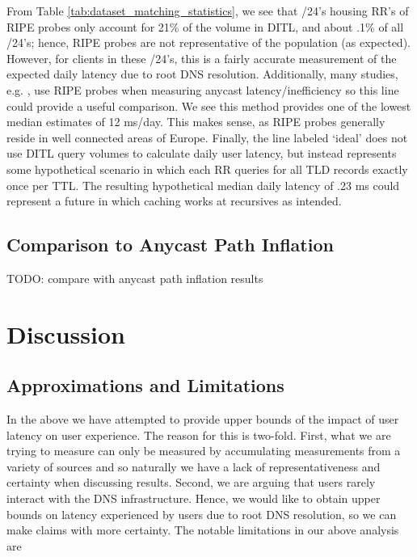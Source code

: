 \documentclass[sigconf,nonacm,10pt]{acmart}
\begin{document}
From Table \ref{tab:dataset_matching_statistics}, we see that /24's
housing RR's of RIPE probes only account for 21\% of the volume in DITL,
and about .1\% of all /24's; hence, RIPE probes are not representative
of the population (as expected). However, for clients in these /24's,
this is a fairly accurate measurement of the expected daily latency due
to root DNS resolution. Additionally, many studies, e.g.
\cite{li_levin_spring_bhattacharjee_2018}, use RIPE probes when
measuring anycast latency/inefficiency so this line could provide a
useful comparison. We see this method provides one of the lowest median
estimates of 12 ms/day. This makes sense, as RIPE probes generally
reside in well connected areas of Europe. \break \break
Finally, the line labeled `ideal' does not use DITL query volumes to
calculate daily user latency, but instead represents some hypothetical
scenario in which each RR queries for all TLD records exactly once per
TTL. The resulting hypothetical median daily latency of .23 ms could
represent a future in which caching works at recursives as intended.

\subsection{Comparison to Anycast Path
Inflation}\label{comparison-to-anycast-path-inflation}

TODO: compare with anycast path inflation results

\section{Discussion}\label{discussion}

\subsection{Approximations and
Limitations}\label{approximations-and-limitations}

In the above we have attempted to provide upper bounds of the impact of
user latency on user experience. The reason for this is two-fold. First,
what we are trying to measure can only be measured by accumulating
measurements from a variety of sources and so naturally we have a lack
of representativeness and certainty when discussing results. Second, we
are arguing that users rarely interact with the DNS infrastructure.
Hence, we would like to obtain upper bounds on latency experienced by
users due to root DNS resolution, so we can make claims with more
certainty. \break \break
The notable limitations in our above analysis are
\end{document}
